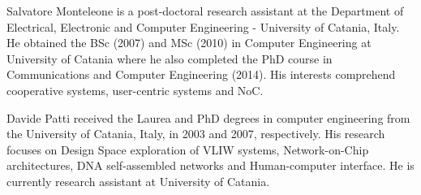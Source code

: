 \documentclass[preprint]{elsarticle}
\begin{document}
Salvatore Monteleone is a post-doctoral research assistant at the
Department of Electrical, Electronic and Computer Engineering -
University of Catania, Italy. He obtained the BSc (2007) and MSc
(2010) in Computer Engineering at University of Catania where he also
completed the PhD course in Communications and Computer Engineering
(2014).  His interests comprehend cooperative systems, user-centric
systems and NoC.

Davide Patti received the Laurea and PhD degrees in computer
engineering from the University of Catania, Italy, in 2003 and 2007,
respectively. His research focuses on Design Space exploration of VLIW
systems, Network-on-Chip architectures, DNA self-assembled networks
and Human-computer interface. He is currently research assistant
at University of Catania.
\end{document}
